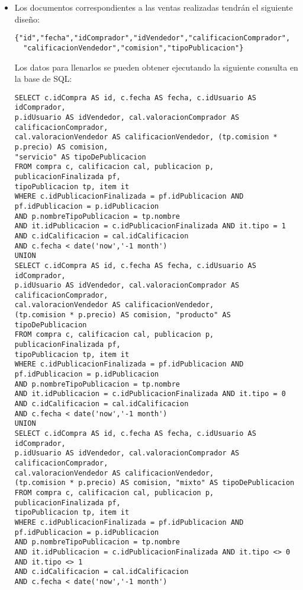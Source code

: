 \begin{itemize}
\item Los documentos correspondientes a las ventas realizadas tendr\'an el siguiente dise\~no:
\begin{verbatim}
{"id","fecha","idComprador","idVendedor","calificacionComprador",
  "calificacionVendedor","comision","tipoPublicacion"}
\end{verbatim}
Los datos para llenarlos se pueden obtener ejecutando la siguiente consulta en la base de SQL:
\begin{verbatim}
SELECT c.idCompra AS id, c.fecha AS fecha, c.idUsuario AS idComprador,
p.idUsuario AS idVendedor, cal.valoracionComprador AS calificacionComprador, 
cal.valoracionVendedor AS calificacionVendedor, (tp.comision * p.precio) AS comision, 
"servicio" AS tipoDePublicacion
FROM compra c, calificacion cal, publicacion p, publicacionFinalizada pf, 
tipoPublicacion tp, item it
WHERE c.idPublicacionFinalizada = pf.idPublicacion AND pf.idPublicacion = p.idPublicacion 
AND p.nombreTipoPublicacion = tp.nombre 
AND it.idPublicacion = c.idPublicacionFinalizada AND it.tipo = 1
AND c.idCalificacion = cal.idCalificacion
AND c.fecha < date('now','-1 month')
UNION
SELECT c.idCompra AS id, c.fecha AS fecha, c.idUsuario AS idComprador, 
p.idUsuario AS idVendedor, cal.valoracionComprador AS calificacionComprador, 
cal.valoracionVendedor AS calificacionVendedor, 
(tp.comision * p.precio) AS comision, "producto" AS tipoDePublicacion
FROM compra c, calificacion cal, publicacion p, publicacionFinalizada pf, 
tipoPublicacion tp, item it
WHERE c.idPublicacionFinalizada = pf.idPublicacion AND pf.idPublicacion = p.idPublicacion 
AND p.nombreTipoPublicacion = tp.nombre 
AND it.idPublicacion = c.idPublicacionFinalizada AND it.tipo = 0
AND c.idCalificacion = cal.idCalificacion
AND c.fecha < date('now','-1 month')
UNION
SELECT c.idCompra AS id, c.fecha AS fecha, c.idUsuario AS idComprador, 
p.idUsuario AS idVendedor, cal.valoracionComprador AS calificacionComprador, 
cal.valoracionVendedor AS calificacionVendedor, 
(tp.comision * p.precio) AS comision, "mixto" AS tipoDePublicacion
FROM compra c, calificacion cal, publicacion p, publicacionFinalizada pf, 
tipoPublicacion tp, item it
WHERE c.idPublicacionFinalizada = pf.idPublicacion AND pf.idPublicacion = p.idPublicacion 
AND p.nombreTipoPublicacion = tp.nombre 
AND it.idPublicacion = c.idPublicacionFinalizada AND it.tipo <> 0 AND it.tipo <> 1
AND c.idCalificacion = cal.idCalificacion
AND c.fecha < date('now','-1 month')
\end{verbatim}

\end{itemize}
